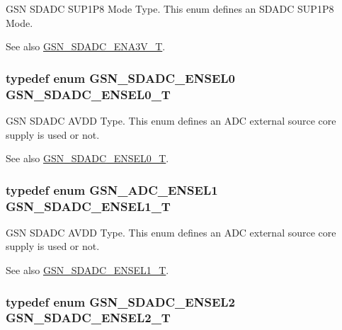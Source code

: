 GSN SDADC SUP1P8 Mode Type. This enum defines an SDADC SUP1P8 Mode. 

\begin{DoxySeeAlso}{See also}
\hyperlink{a00652_ga7c75febfa676ff7198e6665692e07c61}{GSN\_\-SDADC\_\-ENA3V\_\-T}. 
\end{DoxySeeAlso}
\hypertarget{a00652_ga00d5cf84ae6ccebc46f9cd2c1bb63af0}{
\subsubsection[{GSN\_\-SDADC\_\-ENSEL0\_\-T}]{\setlength{\rightskip}{0pt plus 5cm}typedef enum {\bf GSN\_\-SDADC\_\-ENSEL0}  {\bf GSN\_\-SDADC\_\-ENSEL0\_\-T}}}
\label{a00652_ga00d5cf84ae6ccebc46f9cd2c1bb63af0}


GSN SDADC AVDD Type. This enum defines an ADC external source core supply is used or not. 

\begin{DoxySeeAlso}{See also}
\hyperlink{a00652_ga00d5cf84ae6ccebc46f9cd2c1bb63af0}{GSN\_\-SDADC\_\-ENSEL0\_\-T}. 
\end{DoxySeeAlso}
\hypertarget{a00652_ga9cf5d5c5ebe5edb5cda45eb9a6e466ef}{
\subsubsection[{GSN\_\-SDADC\_\-ENSEL1\_\-T}]{\setlength{\rightskip}{0pt plus 5cm}typedef enum {\bf GSN\_\-ADC\_\-ENSEL1}  {\bf GSN\_\-SDADC\_\-ENSEL1\_\-T}}}
\label{a00652_ga9cf5d5c5ebe5edb5cda45eb9a6e466ef}


GSN SDADC AVDD Type. This enum defines an ADC external source core supply is used or not. 

\begin{DoxySeeAlso}{See also}
\hyperlink{a00652_ga9cf5d5c5ebe5edb5cda45eb9a6e466ef}{GSN\_\-SDADC\_\-ENSEL1\_\-T}. 
\end{DoxySeeAlso}
\hypertarget{a00652_gae94467e442a092eb6c551e3076850d12}{
\subsubsection[{GSN\_\-SDADC\_\-ENSEL2\_\-T}]{\setlength{\rightskip}{0pt plus 5cm}typedef enum {\bf GSN\_\-SDADC\_\-ENSEL2}  {\bf GSN\_\-SDADC\_\-ENSEL2\_\-T}}}
\label{a00652_gae94467e442a092eb6c551e3076850d12}


